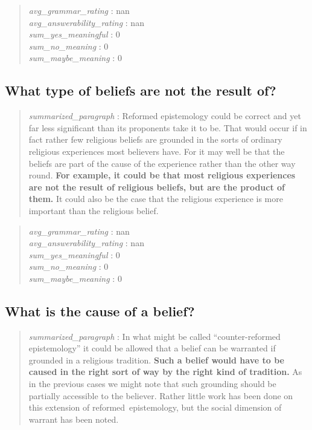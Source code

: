 \begin{quote}
\emph{avg\_grammar\_rating} : nan\\
\emph{avg\_answerability\_rating} : nan\\
\emph{sum\_yes\_meaningful} : 0\\
\emph{sum\_no\_meaning} : 0\\
\emph{sum\_maybe\_meaning} : 0
\end{quote}

\hypertarget{what-type-of-beliefs-are-not-the-result-of}{%
\subsection{What type of beliefs are not the result
of?}\label{what-type-of-beliefs-are-not-the-result-of}}

\begin{quote}
\emph{summarized\_paragraph} : Reformed epistemology could be correct
and yet far less significant than its proponents take it to be. That
would occur if in fact rather few religious beliefs are grounded in the
sorts of ordinary religious experiences most believers have. For it may
well be that the beliefs are part of the cause of the experience rather
than the other way round. \textbf{For example, it could be that most
religious experiences are not the result of religious beliefs, but are
the product of them.} It could also be the case that the religious
experience is more important than the religious belief.
\end{quote}

\begin{quote}
\emph{avg\_grammar\_rating} : nan\\
\emph{avg\_answerability\_rating} : nan\\
\emph{sum\_yes\_meaningful} : 0\\
\emph{sum\_no\_meaning} : 0\\
\emph{sum\_maybe\_meaning} : 0
\end{quote}

\hypertarget{what-is-the-cause-of-a-belief}{%
\subsection{What is the cause of a
belief?}\label{what-is-the-cause-of-a-belief}}

\begin{quote}
\emph{summarized\_paragraph} : In what might be called
``counter-reformed epistemology'' it could be allowed that a belief can
be warranted if grounded in a religious tradition. \textbf{Such a belief
would have to be caused in the right sort of way by the right kind of
tradition.} As in the previous cases we might note that such grounding
should be partially accessible to the believer. Rather little work has
been done on this extension of reformed~epistemology, but the social
dimension of warrant has been noted.
\end{quote}

